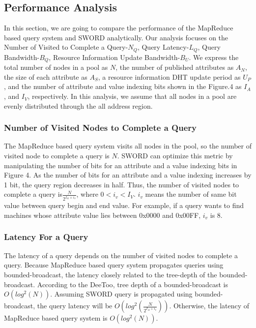 \documentclass{acm_proc_article-sp}
\begin{document}
\subsection{Performance Analysis}
In this section, we are going to compare the performance of the MapReduce based query system and SWORD analytically. 
Our analysis focuses on the Number of Visited to Complete a Query-$N_Q$, Query Latency-$L_Q$, Query Bandwidth-$B_Q$, Resource Information Update Bandwidth-$B_U$.
We express the total number of nodes in a pool as $N$, the number of published attributes as $A_N$, the size of each attribute as $A_S$, a resource information DHT update period as $U_P$, 
and the number of attribute and value indexing bits shown in the Figure.4 as $I_A$, and $I_V$, respectively. In this analysis, we assume that all nodes in a pool are evenly distributed through the all address region.

\subsubsection{Number of Visited Nodes to Complete a Query}
The MapReduce based query system visits all nodes in the pool, so the number of visited node to complete a query is $N$.
SWORD can optimize this metric by manipulating the number of bits for an attribute and a value indexing bits in Figure 4. As the number of bits for an attribute and a value indexing increases by 1 bit, 
the query region decreases in half. Thus, the number of visited nodes to complete a query is\begin{math}\frac{N}{2^{I_A+i_v}}\end{math}, where \begin{math}0<i_v<I_V\end{math}.
\begin{math}i_v\end{math} means the number of same bit value between query begin and end value. For example, if a query wants to find machines whose attribute value lies between 0x0000 and 0x00FF, \begin{math}i_v\end{math} is 8. 
\subsubsection{Latency For a Query}
The latency of a query depends on the number of visited nodes to complete a query. Because MapReduce based query system propagates queries using bounded-broadcast, the latency closely related to
the tree-depth of the bounded-broadcast. According to the DeeToo\cite{deetoo}, tree depth of a bounded-broadcast is \begin{math}O(log^2(N))\end{math}. Assuming SWORD query is propagated using bounded-broadcast,
the query latency will be  \begin{math}O(log^2(\frac{N}{2^{I_A+i_v}}))\end{math}. Otherwise, the latency of MapReduce based query system is  \begin{math}O(log^2(N))\end{math}.
\end{document}
